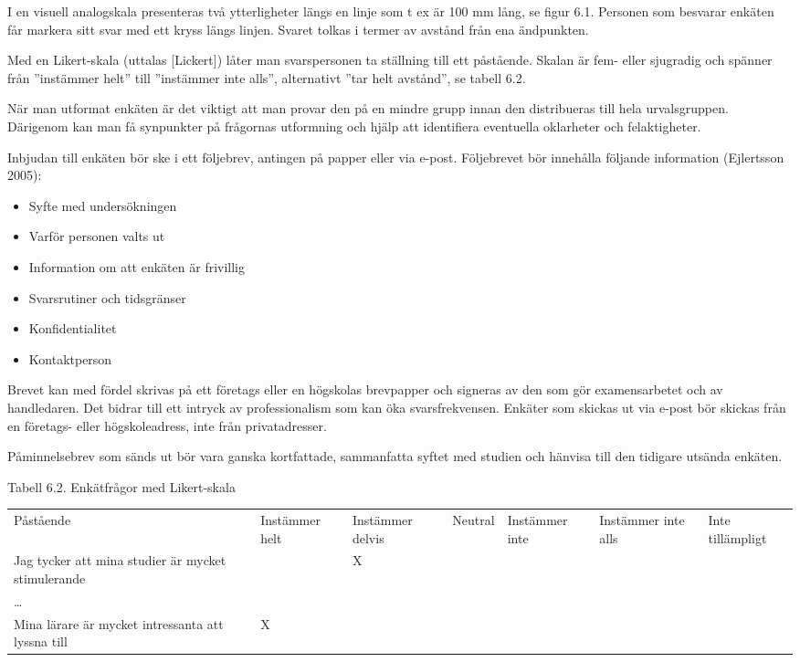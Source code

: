 I en visuell analogskala presenteras två ytterligheter längs en linje
som t ex är 100 mm lång, se figur 6.1. Personen som besvarar enkäten får
markera sitt svar med ett kryss längs linjen. Svaret tolkas i termer av
avstånd från ena ändpunkten.

Med en Likert-skala (uttalas {[}Lickert{]}) låter man svarspersonen ta
ställning till ett påstående. Skalan är fem- eller sjugradig och spänner
från ''instämmer helt'' till ''instämmer inte alls'', alternativt ''tar
helt avstånd'', se tabell 6.2.

När man utformat enkäten är det viktigt att man provar den på en mindre
grupp innan den distribueras till hela urvalsgruppen. Därigenom kan man
få synpunkter på frågornas utformning och hjälp att identifiera
eventuella oklarheter och felaktigheter.

Inbjudan till enkäten bör ske i ett följebrev, antingen på papper eller
via e-post. Följebrevet bör innehålla följande information (Ejlertsson
2005):

\begin{itemize}
\item
  Syfte med undersökningen
\item
  Varför personen valts ut
\item
  Information om att enkäten är frivillig
\item
  Svarsrutiner och tidsgränser
\item
  Konfidentialitet
\item
  Kontaktperson
\end{itemize}

Brevet kan med fördel skrivas på ett företags eller en högskolas
brevpapper och signeras av den som gör examensarbetet och av
handledaren. Det bidrar till ett intryck av professionalism som kan öka
svarsfrekvensen. Enkäter som skickas ut via e-post bör skickas från en
företags- eller högskoleadress, inte från privatadresser.

Påminnelsebrev som sänds ut bör vara ganska kortfattade, sammanfatta
syftet med studien och hänvisa till den tidigare utsända enkäten.

Tabell 6.2. Enkätfrågor med Likert-skala

\begin{longtable}[]{@{}lllllll@{}}
\toprule
Påstående & Instämmer helt & Instämmer delvis & Neutral & Instämmer inte
& Instämmer inte alls & Inte tillämpligt\tabularnewline
Jag tycker att mina studier är mycket stimulerande & & X & & &
&\tabularnewline
\ldots{} & & & & & &\tabularnewline
Mina lärare är mycket intressanta att lyssna till & X & & & &
&\tabularnewline
\bottomrule
\end{longtable}

